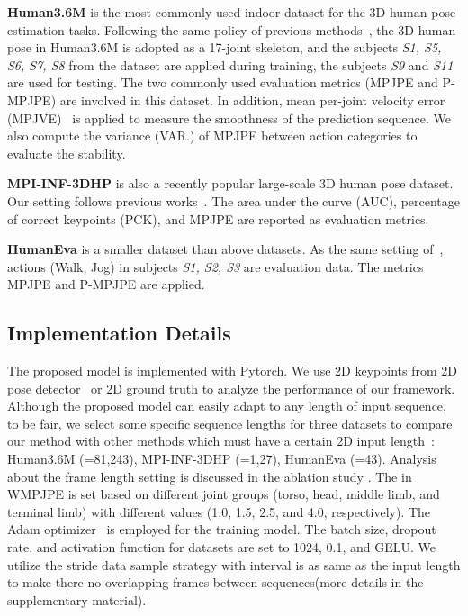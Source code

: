\documentclass[10pt,twocolumn,letterpaper]{article}
\begin{document}
	\textbf{Human3.6M} is the most commonly used indoor dataset for the 3D human pose estimation tasks. 
Following the same policy of previous methods~\cite{corsetofine, simplebaseline, ordinaldepth, videopose3d, attentionmechanism, poseformer, anatomypose}, the 3D human pose in Human3.6M is adopted as a 17-joint skeleton, and the subjects \textit{S1, S5, S6, S7, S8} from the dataset are applied during training, the subjects \textit{S9} and \textit{S11} are used for testing. 
	The two commonly used evaluation metrics (MPJPE and P-MPJPE) are involved in this dataset. 
In addition, mean per-joint velocity error (MPJVE)~\cite{videopose3d} is applied to measure the smoothness of the prediction sequence. 
	We also compute the variance (VAR.) of MPJPE between action categories to evaluate the stability.
	
	\textbf{MPI-INF-3DHP} is also a recently popular large-scale 3D human pose dataset. 
Our setting follows previous works~\cite{motionguidepose,poseformer}.
	The area under the curve (AUC), percentage of correct keypoints (PCK), and MPJPE are reported as evaluation metrics.
	
	\textbf{HumanEva} is a smaller dataset than above datasets.
As the same setting of~\cite{attentionmechanism, poseformer}, actions (Walk, Jog) in subjects \textit{S1, S2, S3} are evaluation data. 
	The metrics MPJPE and P-MPJPE are applied.
	
	\subsection{Implementation Details}
The proposed model is implemented with Pytorch.
	We use 2D keypoints from 2D pose detector~\cite{sun2019deep, chen2018cascaded} or 2D ground truth to analyze the performance of our framework.
Although the proposed model can easily adapt to any length of input sequence, to be fair, we select some specific sequence lengths  for three datasets to compare our method with other methods which must have a certain 2D input length~\cite{videopose3d,anatomypose,attentionmechanism}: Human3.6M (=81,243), MPI-INF-3DHP (=1,27), HumanEva (=43).
	Analysis about the frame length setting is discussed in the ablation study .
	The  in WMPJPE is set
    based on different joint groups (torso, head, middle limb,
    and terminal limb) with different values (1.0, 1.5, 2.5, and
    4.0, respectively).
	The Adam optimizer~\cite{kingma2014adam} is employed for the training model.
	The batch size, dropout rate, and activation function for datasets are set to 1024, 0.1, and GELU.
	We utilize the stride data sample strategy with interval is as same as the input length to make there no overlapping frames between sequences(more details in the supplementary material).
\end{document}
